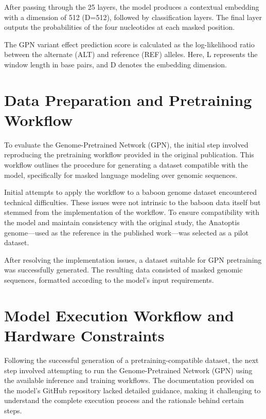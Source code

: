 \documentclass[
  a4paper,
  openany]{scrbook}
\begin{document}
After passing through the 25 layers, the model produces a contextual
embedding with a dimension of 512 (D=512), followed by classification
layers. The final layer outputs the probabilities of the four
nucleotides at each masked position.

The GPN variant effect prediction score is calculated as the
log-likelihood ratio between the alternate (ALT) and reference (REF)
alleles. Here, L represents the window length in base pairs, and D
denotes the embedding dimension.

\section{Data Preparation and Pretraining
Workflow}\label{data-preparation-and-pretraining-workflow}

To evaluate the Genome-Pretrained Network (GPN), the initial step
involved reproducing the pretraining workflow provided in the original
publication. This workflow outlines the procedure for generating a
dataset compatible with the model, specifically for masked language
modeling over genomic sequences.

Initial attempts to apply the workflow to a baboon genome dataset
encountered technical difficulties. These issues were not intrinsic to
the baboon data itself but stemmed from the implementation of the
workflow. To ensure compatibility with the model and maintain
consistency with the original study, the Anatoptis genome---used as the
reference in the published work---was selected as a pilot dataset.

After resolving the implementation issues, a dataset suitable for GPN
pretraining was successfully generated. The resulting data consisted of
masked genomic sequences, formatted according to the model's input
requirements.

\section{Model Execution Workflow and Hardware
Constraints}\label{model-execution-workflow-and-hardware-constraints}

Following the successful generation of a pretraining-compatible dataset,
the next step involved attempting to run the Genome-Pretrained Network
(GPN) using the available inference and training workflows. The
documentation provided on the model's GitHub repository lacked detailed
guidance, making it challenging to understand the complete execution
process and the rationale behind certain steps.
\end{document}
